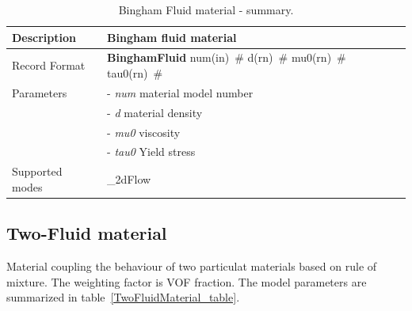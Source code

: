 \documentclass[epsf,a4paper]{article}
\newcommand{\descitem}[1]{{\noindent \bf #1}}
\newcommand{\elemparam}[2]{{{#1\tiny (#2)}~\#}}
\newcommand{\param}[1]{{\it #1}}
\begin{document}
\begin{table}[h]                                                                
\begin{tabular}{|l|p{9cm}|}                                                      
\hline                                                                          
Description & Bingham fluid material\\
\hline                                                                          
Record Format & \descitem{BinghamFluid} \elemparam{num}{in}
\elemparam{d}{rn} \elemparam{mu0}{rn} \elemparam{tau0}{rn}\\
Parameters &- \param{num} material model number\\
&- \param{d} material density\\
&- \param{mu0} viscosity\\
&- \param{tau0} Yield stress\\
Supported modes& \_2dFlow\\
\hline
\end{tabular}                                                                   
\caption{Bingham Fluid material - summary.}                
\label{BinghamFluidMaterial_table}                                                         
\end{table}           

\subsection{Two-Fluid material}
\label{TwoFluidMaterial}
Material coupling the behaviour of two particulat materials based on
rule of mixture. The weighting factor is VOF fraction.
The model parameters are summarized in table~\ref{TwoFluidMaterial_table}.
\end{document}
